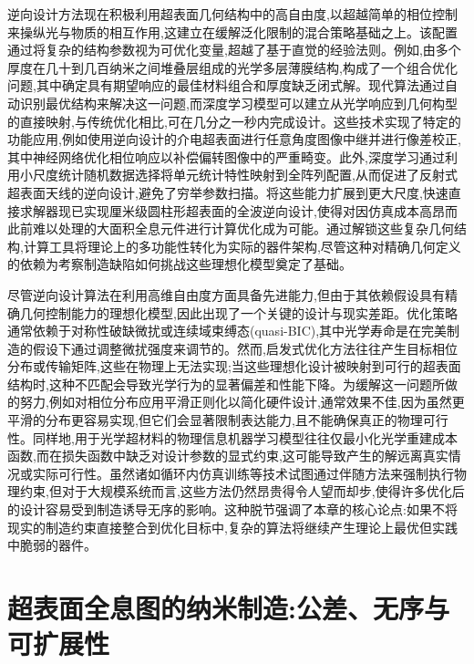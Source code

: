 \documentclass[11pt]{article}
\begin{document}
逆向设计方法现在积极利用超表面几何结构中的高自由度,以超越简单的相位控制来操纵光与物质的相互作用,这建立在缓解泛化限制的混合策略基础之上。该配置通过将复杂的结构参数视为可优化变量,超越了基于直觉的经验法则。例如,由多个厚度在几十到几百纳米之间堆叠层组成的光学多层薄膜结构,构成了一个组合优化问题,其中确定具有期望响应的最佳材料组合和厚度缺乏闭式解。现代算法通过自动识别最优结构来解决这一问题,而深度学习模型可以建立从光学响应到几何构型的直接映射,与传统优化相比,可在几分之一秒内完成设计。这些技术实现了特定的功能应用,例如使用逆向设计的介电超表面进行任意角度图像中继并进行像差校正,其中神经网络优化相位响应以补偿偏转图像中的严重畸变。此外,深度学习通过利用小尺度统计随机数据选择将单元统计特性映射到全阵列配置,从而促进了反射式超表面天线的逆向设计,避免了穷举参数扫描。将这些能力扩展到更大尺度,快速直接求解器现已实现厘米级圆柱形超表面的全波逆向设计,使得对因仿真成本高昂而此前难以处理的大面积全息元件进行计算优化成为可能。通过解锁这些复杂几何结构,计算工具将理论上的多功能性转化为实际的器件架构,尽管这种对精确几何定义的依赖为考察制造缺陷如何挑战这些理想化模型奠定了基础。\citep{doi_10_1016_j_isci_2025_112222_1f7c10f5} \citep{doi_10_1364_oe_519179_39046c11} \citep{doi_10_1002_mop_34068_b2e55b41} \citep{doi_10_1515_nanoph_2024_0127_c4fd5a12}

尽管逆向设计算法在利用高维自由度方面具备先进能力,但由于其依赖假设具有精确几何控制能力的理想化模型,因此出现了一个关键的设计与现实差距。优化策略通常依赖于对称性破缺微扰或连续域束缚态(quasi-BIC),其中光学寿命是在完美制造的假设下通过调整微扰强度来调节的。然而,启发式优化方法往往产生目标相位分布或传输矩阵,这些在物理上无法实现;当这些理想化设计被映射到可行的超表面结构时,这种不匹配会导致光学行为的显著偏差和性能下降。为缓解这一问题所做的努力,例如对相位分布应用平滑正则化以简化硬件设计,通常效果不佳,因为虽然更平滑的分布更容易实现,但它们会显著限制表达能力,且不能确保真正的物理可行性。同样地,用于光学超材料的物理信息机器学习模型往往仅最小化光学重建成本函数,而在损失函数中缺乏对设计参数的显式约束,这可能导致产生的解远离真实情况或实际可行性。虽然诸如循环内仿真训练等技术试图通过伴随方法来强制执行物理约束,但对于大规模系统而言,这些方法仍然昂贵得令人望而却步,使得许多优化后的设计容易受到制造诱导无序的影响。这种脱节强调了本章的核心论点:如果不将现实的制造约束直接整合到优化目标中,复杂的算法将继续产生理论上最优但实践中脆弱的器件。\citep{doi_10_1103_physrevapplied_21_044004_d1b93ffe} \citep{doi_10_48550_arxiv_2505_18377_a6fc9ec3} \citep{doi_10_1002_adpr_202300158_66d61883}

\section{超表面全息图的纳米制造:公差、无序与可扩展性}\label{ux8d85ux8868ux9762ux5168ux606fux56feux7684ux7eb3ux7c73ux5236ux9020ux516cux5deeux65e0ux5e8fux4e0eux53efux6269ux5c55ux6027}
\end{document}
